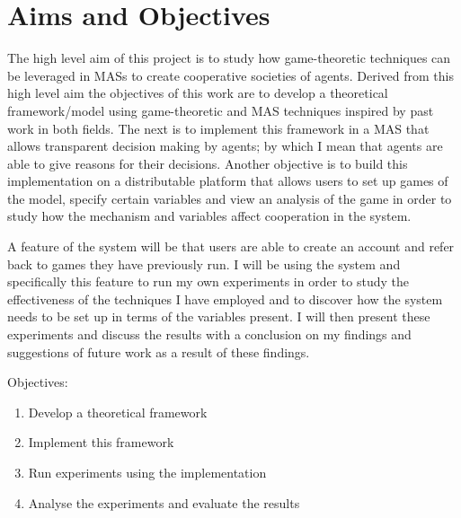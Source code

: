 \documentclass[]{final_report}
\begin{document}
\section{Aims and Objectives}
\label{sec:aao}
The high level aim of this project is to study how game-theoretic techniques can be leveraged in MASs to create cooperative societies of agents. Derived from this high level aim the objectives of this work are to develop a theoretical framework/model using game-theoretic and MAS techniques inspired by past work in both fields. The next is to implement this framework in a MAS that allows transparent decision making by agents; by which I mean that agents are able to give reasons for their decisions. Another objective is to build this implementation on a distributable platform that allows users to set up games of the model, specify certain variables and view an analysis of the game in order to study how the mechanism and variables affect cooperation in the system.\par
A feature of the system will be that users are able to create an account and refer back to games they have previously run. I will be using the system and specifically this feature to run my own experiments in order to study the effectiveness of the techniques I have employed and to discover how the system needs to be set up in terms of the variables present. I will then present these experiments and discuss the results with a conclusion on my findings and suggestions of future work as a result of these findings.\par
Objectives:
\begin{enumerate}
	\item Develop a theoretical framework
	\item Implement this framework
	\item Run experiments using the implementation
	\item Analyse the experiments and evaluate the results
\end{enumerate}
\end{document}
